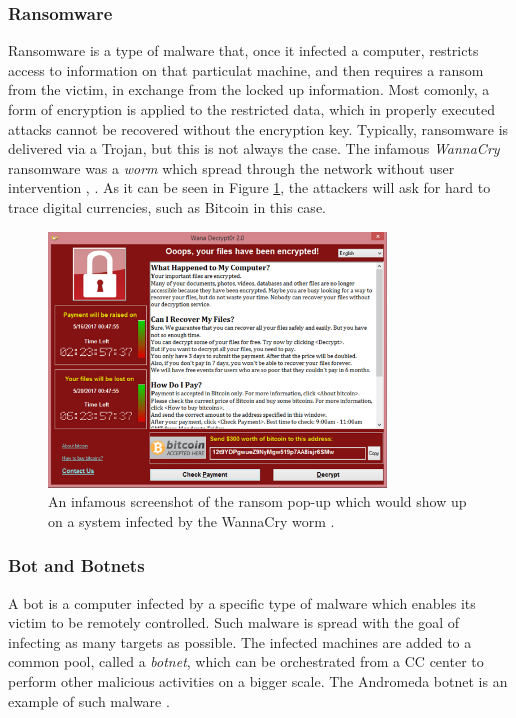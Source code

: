 \subsubsection{Ransomware}

Ransomware is a type of malware that, once it infected a computer, restricts access to information on that particulat machine, and then requires a ransom from the victim, in exchange from the locked up information. Most comonly, a form of encryption is applied to the restricted data, which in properly executed attacks cannot be recovered without the encryption key. Typically, ransomware is delivered via a Trojan, but this is not always the case. The infamous \emph{WannaCry} ransomware was a \emph{worm} which spread through the network without user intervention \cite{wiki_wannacry}, \cite{wiki_ransomware}. As it can be seen in Figure \ref{fig:wannacry}, the attackers will ask for hard to trace digital currencies, such as Bitcoin in this case.

\begin{figure}[h]
    \centering
    \includegraphics[width=0.8\textwidth]{./images/wanacry.png}
    \caption{An infamous screenshot of the ransom pop-up which would show up on a system infected by the WannaCry worm \cite{wiki_wannacry}.}
    \label{fig:wannacry}
\end{figure}

\subsubsection{Bot and Botnets}

A bot is a computer infected by a specific type of malware which enables its victim to be remotely controlled. Such malware is spread with the goal of infecting as many targets as possible. The infected machines are added to a common pool, called a \emph{botnet}, which can be orchestrated from a \gls{CC} center to perform other malicious activities on a bigger scale. The Andromeda botnet is an example of such malware \cite{andromeda} \cite{kaspersky_malware_types}.

